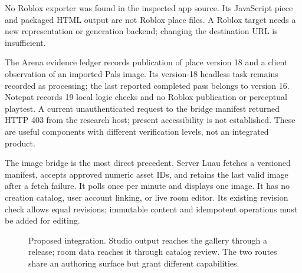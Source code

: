 \documentclass[10pt,letterpaper,twocolumn]{article}
\begin{document}
No Roblox exporter was found in the inspected app source. Its JavaScript piece and packaged HTML output are not Roblox place files. A Roblox target needs a new representation or generation backend; changing the destination URL is insufficient.

The Arena evidence ledger records publication of place version 18 and a client observation of an imported Pals image. Its version-18 headless task remains recorded as processing; the last reported completed pass belongs to version 16. Notepat records 19 local logic checks and no Roblox publication or perceptual playtest. A current unauthenticated request to the bridge manifest returned HTTP 403 from the research host; present accessibility is not established. These are useful components with different verification levels, not an integrated product.

The image bridge is the most direct precedent. Server Luau fetches a versioned manifest, accepts approved numeric asset IDs, and retains the last valid image after a fetch failure. It polls once per minute and displays one image. It has no creation catalog, user account linking, or live room editor. Its existing revision check allows equal revisions; immutable content and idempotent operations must be added for editing.

\begin{figure}[t]
\centering
{}
\caption{Proposed integration. Studio output reaches the gallery through a release; room data reaches it through catalog review. The two routes share an authoring surface but grant different capabilities.}
\label{fig:routes}
\end{figure}
\end{document}
